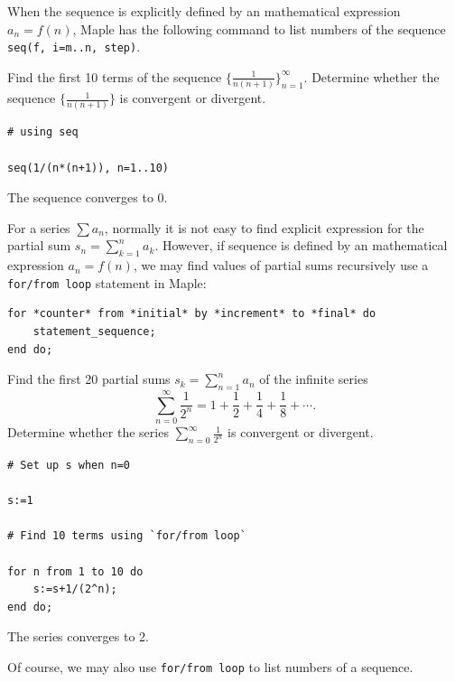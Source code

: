 \documentclass[]{book}
\theoremstyle{definition}
\theoremstyle{definition}
\theoremstyle{definition}
\theoremstyle{remark}
\let\BeginKnitrBlock\begin \let\EndKnitrBlock\end
\begin{document}
When the sequence is explicitly defined by an mathematical expression \(a_n=f(n)\), Maple has the following command to list numbers of the sequence \texttt{seq(f,\ i=m..n,\ step)}.

\BeginKnitrBlock{example}
\protect\hypertarget{exm:seq-eg}{}{\label{exm:seq-eg} }
Find the first 10 terms of the sequence \(\{\frac{1}{n(n+1)}\}_{n=1}^\infty\). Determine whether the sequence \(\{\frac{1}{n(n+1)}\}\) is convergent or divergent.
\EndKnitrBlock{example}

\BeginKnitrBlock{solution}
{}

\begin{verbatim}
# using seq

seq(1/(n*(n+1)), n=1..10)
\end{verbatim}

The sequence converges to \(0\).
\EndKnitrBlock{solution}

For a series \(\sum a_n\), normally it is not easy to find explicit expression for the partial sum \(s_n=\sum\limits_{k=1}^n a_k\). However, if sequence is defined by an mathematical expression \(a_n=f(n)\), we may find values of partial sums recursively use a \texttt{for/from\ loop} statement in Maple:

\begin{verbatim}
for *counter* from *initial* by *increment* to *final* do
    statement_sequence;
end do;
\end{verbatim}

\BeginKnitrBlock{example}
\protect\hypertarget{exm:unnamed-chunk-2}{}{\label{exm:unnamed-chunk-2} }
Find the first 20 partial sums \(s_k=\sum_{n=1}^{n}a_n\) of the infinite series
\[
\sum_{n=0}^\infty\frac1{2^n}=1+\frac12+\frac14+\frac18+\cdots.
\]
Determine whether the series \(\sum_{n=0}^\infty\frac1{2^n}\) is convergent or divergent.
\EndKnitrBlock{example}

\BeginKnitrBlock{solution}
{}

\begin{verbatim}
# Set up s when n=0

s:=1

# Find 10 terms using `for/from loop`

for n from 1 to 10 do
    s:=s+1/(2^n);
end do;
\end{verbatim}

The series converges to 2.
\EndKnitrBlock{solution}

Of course, we may also use \texttt{for/from\ loop} to list numbers of a sequence.
\end{document}
